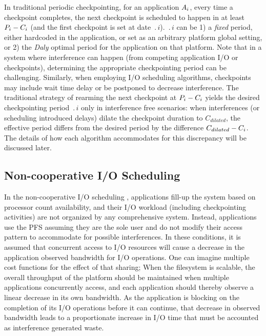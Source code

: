 In traditional periodic checkpointing, for an application $A_{i}$,
every time a checkpoint completes, the next checkpoint is scheduled to
happen in at least $P_{i}-C_{i}$ (and the first checkpoint is
set at date $\period{i}$). $\period{i}$ can be 1) a \emph{fixed} period,
either hardcoded in the application, or set as an arbitrary platform
global setting, or 2) the \emph{Daly} optimal period for the
application on that platform. Note that in a system where interference
can happen (from competing application I/O or checkpoints), determining
the appropriate checkpointing period can be challenging.
Similarly, when employing I/O scheduling algorithms,
checkpoints may include wait time delay or be postponed to decrease
interference. The traditional strategy of rearming the next checkpoint at
$P_{i}-C_{i}$ yields the desired checkpointing period $\period{i}$
only in interference free scenarios: when interferences (or scheduling
introduced delays) dilate the checkpoint duration to $C_{dilated}$, the effective
period differs from the desired period by the difference $C_{dilated}-C_{i}$.
The details of how each algorithm accommodates for this discrepancy will
be discussed later.


\subsection{Non-cooperative \nocoop I/O Scheduling}

In the non-cooperative I/O scheduling \nocoop, applications
fill-up the system based on processor count availability, and their I/O
workload (including checkpointing activities) are not organized by any
comprehensive system. Instead, applications use the PFS assuming they
are the sole user and do not modify their access pattern to accommodate
for possible interferences. In these conditions, it is assumed that
concurrent access
to I/O resources will cause a decrease in the application observed
bandwidth for I/O operations. One can imagine multiple cost functions
for the effect of that sharing; When the filesystem is scalable, the
overall throughput of the platform should be maintained when multiple
applications concurrently access, and each application should thereby
observe a linear decrease in its own bandwidth. As the application is
blocking on the completion of its I/O operations before it can continue,
that decrease in observed bandwidth leads to a proportionate increase in
I/O time that must be accounted as interference generated waste.

